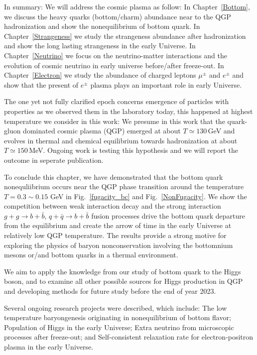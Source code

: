 
In summary: We will address the cosmic plasma as follow: In Chapter~\ref{Bottom}, we discuss the heavy quarks (bottom/charm) abundance near to the QGP hadronization and show the nonequilibrium of bottom quark. In Chapter~\ref{Strangeness} we study the strangeness abundance after hadronization and show the long lasting strangeness in the early Universe. In Chapter~\ref{Neutrino} we focus on the neutrino-matter interactions and the evolution of cosmic neutrino in early universe before/after freeze-out. In Chapter~\ref{Electron} we study the abundance of charged leptons $\mu^\pm$ and $e^\pm$ and show that the present of $e^\pm$ plasma plays an important role in early Universe.

The one yet not fully clarified epoch concerns emergence of particles with properties as we observed them in the laboratory today, this happened at highest temperature we consider in this work: We presume in this work that the quark-gluon dominated cosmic plasma (QGP) emerged at about $T\simeq 130$\,GeV and evolves in thermal and chemical equilibrium towards hadronization at about $T\simeq150$\,MeV. Ongoing work is testing this hypothesis and we will report the outcome in seperate publication. 




To conclude this chapter, we have demonstrated that the bottom quark nonequliibrium occurs near the QGP phase transition around the temperature $T=0.3\sim0.15$ GeV in Fig.~\ref{fugacity_bc} and Fig.~\ref{NonFugacity}. We show the competition between weak interaction decay and the strong interaction $g+g\to b+\bar b$, $q+\bar q \to b+\bar b$ fusion processes drive the bottom quark departure from the equilibrium and create the arrow of time in the early Universe at relatively low QGP temperature. The results provide a strong motive for exploring the physics of baryon nonconservation involving the bottomnium mesons or/and bottom quarks in a thermal environment.

 We aim to apply the knowledge from our study of bottom quark to the Higgs boson, and to examine all other possible sources for Higgs production in QGP and developing methods for future study before the end of year 2023.


 
Several ongoing research projects were described, which include: The low temperature baryongenesis originating in nonequilibrium of bottom flavor; Population of Higgs in the early Universe; Extra neutrino from microscopic processes after freeze-out; and Self-consistent relaxation rate for electron-positron plasma in the early Universe.%
 